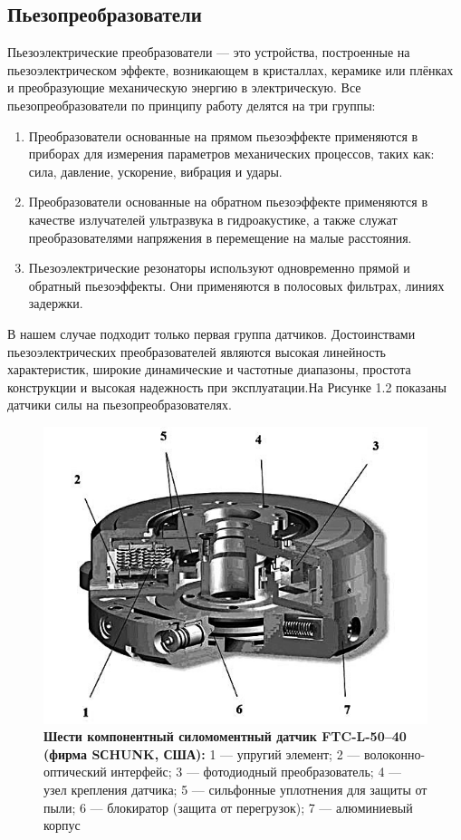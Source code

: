 \documentclass[a4paper,14pt,russian]{extreport} \usepackage{extsizes}
\begin{document}
	\subsection {Пьезопреобразователи}
	Пьезоэлектрические преобразователи — это устройства, построенные на пьезоэлектрическом эффекте, возникающем в кристаллах, керамике или плёнках и преобразующие механическую энергию в электрическую.
	Все пьезопреобразователи по принципу работу делятся на три группы:
	\begin{enumerate} 
		\item Преобразователи основанные на прямом пьезоэффекте применяются в приборах для измерения параметров механических процессов, таких как: сила, давление, ускорение, вибрация и удары.
	
		\item Преобразователи основанные на обратном пьезоэффекте применяются в качестве излучателей ультразвука в гидроакустике, а также служат преобразователями напряжения в перемещение на малые расстояния.
	
		\item Пьезоэлектрические резонаторы используют одновременно прямой и обратный пьезоэффекты.  Они применяются в полосовых фильтрах, линиях задержки.
		
	\end{enumerate}
	В нашем случае подходит только первая группа датчиков. Достоинствами пьезоэлектрических преобразователей являются высокая линейность характеристик, широкие динамические и частотные диапазоны, простота конструкции и высокая надежность при эксплуатации.На Рисунке 1.2 показаны датчики силы на пьезопреобразователях.
	\begin{figure}[ht]
		\centering		 
		\includegraphics{./img/img11.jpg}	
		\caption{
			\textbf{ Шести компонентный силомоментный датчик FTC-L-50–40 (фирма
				SСHUNK, США):}						
			1 — упругий элемент; 2 — волоконно-оптический
			интерфейс; 3 — фотодиодный преобразователь; 4 —
			узел крепления датчика; 5 — сильфонные уплотнения
			для защиты от пыли; 6 — блокиратор (защита от перегрузок); 7 — алюминиевый корпус
		}     
		\label{fig_img11}
	\end{figure}
\end{document}
